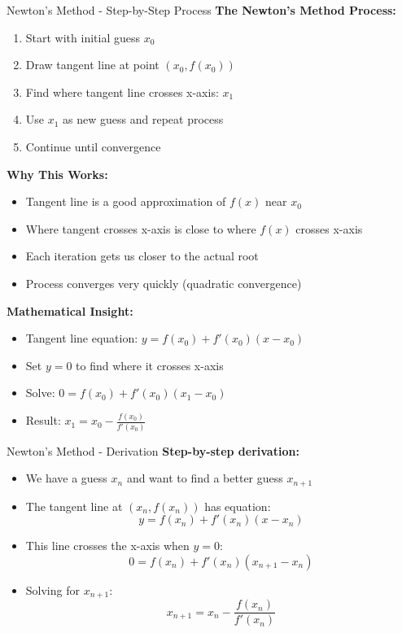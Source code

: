 \documentclass[aspectratio=169]{beamer}
\begin{document}
\begin{frame}{Newton's Method - Step-by-Step Process}
\textbf{The Newton's Method Process:}
\begin{enumerate}
    \item Start with initial guess $x_0$
    \item Draw tangent line at point $(x_0, f(x_0))$
    \item Find where tangent line crosses x-axis: $x_1$
    \item Use $x_1$ as new guess and repeat process
    \item Continue until convergence
\end{enumerate}

\vspace{0.5cm}
\textbf{Why This Works:}
\begin{itemize}
    \item Tangent line is a good approximation of $f(x)$ near $x_0$
    \item Where tangent crosses x-axis is close to where $f(x)$ crosses x-axis
    \item Each iteration gets us closer to the actual root
    \item Process converges very quickly (quadratic convergence)
\end{itemize}

\vspace{0.5cm}
\textbf{Mathematical Insight:}
\begin{itemize}
    \item Tangent line equation: $y = f(x_0) + f'(x_0)(x - x_0)$
    \item Set $y = 0$ to find where it crosses x-axis
    \item Solve: $0 = f(x_0) + f'(x_0)(x_1 - x_0)$
    \item Result: $x_1 = x_0 - \frac{f(x_0)}{f'(x_0)}$
\end{itemize}
\end{frame}

\begin{frame}{Newton's Method - Derivation}
\textbf{Step-by-step derivation:}
\begin{itemize}
    \item We have a guess $x_n$ and want to find a better guess $x_{n+1}$
    \item The tangent line at $(x_n, f(x_n))$ has equation:
    \[y = f(x_n) + f'(x_n)(x - x_n)\]
    \item This line crosses the x-axis when $y = 0$:
    \[0 = f(x_n) + f'(x_n)(x_{n+1} - x_n)\]
    \item Solving for $x_{n+1}$:
    \[x_{n+1} = x_n - \frac{f(x_n)}{f'(x_n)}\]
\end{itemize}
\end{frame}
\end{document}
